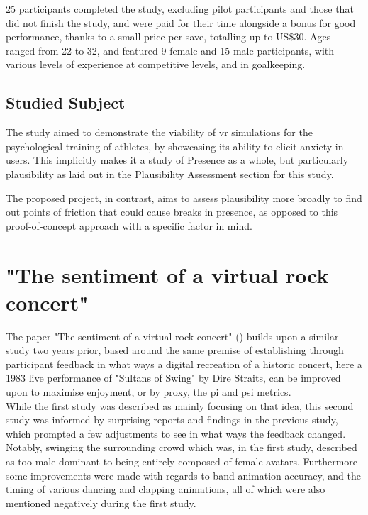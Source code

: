 25 participants completed the study, excluding pilot participants and those that did not finish the study, and were paid for their time alongside a bonus for good performance, thanks to a small price per save, totalling up to US\$30. Ages ranged from 22 to 32, and featured 9 female and 15 male participants, with various levels of experience at competitive levels, and in goalkeeping.

\subsection{Studied Subject}

The study aimed to demonstrate the viability of \gls{vr} simulations for the psychological training of athletes, by showcasing its ability to elicit anxiety in users. This implicitly makes it a study of Presence as a whole, but particularly plausibility as laid out in the Plausibility Assessment section for this study.

The proposed project, in contrast, aims to assess plausibility more broadly to find out points of friction that could cause breaks in presence, as opposed to this proof-of-concept approach with a specific factor in mind.


\section{"The sentiment of a virtual rock concert"}

The paper "The sentiment of a virtual rock concert" (\cite{slater-2023-sentiment}) builds upon a similar study two years prior, based around the same premise of establishing through participant feedback in what ways a digital recreation of a historic concert, here a 1983 live performance of "Sultans of Swing" by Dire Straits, can be improved upon to maximise enjoyment, or by proxy, the \gls{pi} and \gls{psi} metrics.\\

While the first study was described as mainly focusing on that idea, this second study was informed by surprising reports and findings in the previous study, which prompted a few adjustments to see in what ways the feedback changed. Notably, swinging the surrounding crowd which was, in the first study, described as too male-dominant to being entirely composed of female avatars. Furthermore some improvements were made with regards to band animation accuracy, and the timing of various dancing and clapping animations, all of which were also mentioned negatively during the first study.\\

